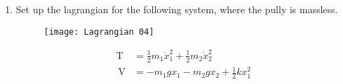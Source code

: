 \begin{enumerate}
\begin{answer}
\begin{align*}
	&=\frac{1}{2}(\dot{\theta})^{2}+\frac{1}{2} m \dot{x}_{3}^{2}=\frac{1}{2} m a^{2} \cdot \dot{\theta}^{2}+\frac{1}{2} m\left(\frac{a}{2} \dot{\theta}+\dot{x}_{2}\right)^{2}\\
	P.E.
	\hspace{2cm}V&=\frac{1}{2} k x_{1}{ }^{2}+\frac{1}{2} k x_{2}{ }^{2}-m g x_{3} .
\intertext{	Hence the Lagrangian for the system is}
\mathrm{L}&=\mathrm{T}-\mathrm{V} \\
\mathrm{L}&=\frac{1}{2} m a^{2} \dot{\theta}^{2}+\frac{1}{2} m\left(\frac{a^{2}}{4} \dot{\theta}^{2}+a \dot{\theta} \dot{x}_{2}+\dot{x}_{2}^{2}\right)-\frac{1}{2} k x_{1}^{2}-\frac{1}{2} k x_{2}^{2}+m g\left(\frac{a}{2} \theta+x_{2}\right)\\
\text{Lagrangian eq. of motion, }&\frac{d}{d t}\left(\frac{\partial L}{\partial \dot{x}_{2}}\right)-\left(\frac{\partial L}{\partial x_{2}}\right)=0 \Rightarrow \frac{d}{d t}\left(\frac{\partial L}{\partial \dot{\theta}}\right)-\left(\frac{\partial L}{\partial \theta}\right)\\
\text { Or } \quad \frac{d}{d t}\left[\frac{1}{2} m a \theta+m \dot{x}_{2}\right]&-\left[-k x_{2}+m g\right]=0  \Rightarrow m \ddot{x}_{2}+k x_{2}+\frac{1}{2} m(a \ddot{\theta}-2 g)=0 \\ 
\text { Or } \quad \ddot{x}+\left(\frac{k}{m}\right) x_{2}&+\frac{1}{2}(a \ddot{\theta}-2 g)=0 \quad  \Rightarrow \frac{d}{d t}\left[\frac{1}{2} m a^{2} \dot{\theta}+\frac{1}{2} m a^{2}+\dot{\theta} \max _{2}\right]-\left[-k a^{2} \theta+\frac{m g a}{2}\right]\\
\text{Or }\quad \frac{3}{4} m a^{2} \ddot{\theta}&+R a^{2} \theta+\frac{1}{2} m a\left(\ddot{x}_{2}-g\right)=0\\
\text{Or }\quad \ddot{\theta}&+\left(\frac{4}{3} \frac{k}{m}\right) \theta+\frac{2}{3 a}\left(\ddot{x}_{2}-g\right)=0
\intertext{Which are the required equation of motion.}
	\end{align*}
\end{answer}
\item Set up the lagrangian for the following system, where the pully is massless.
\begin{figure}[H]
	\centering
	\texttt{[image: Lagrangian 04]}
\end{figure}
\begin{answer}
	\begin{align*}
	\mathrm{T}&=\frac{1}{2} m_{1} \dot{x}_{1}^{2}+\frac{1}{2} m_{2} \dot{x}_{2}^{2}\\
	\mathrm{~V}&=-m_{1} g x_{1}-m_{2} g x_{2}+\frac{1}{2} k x_{1}^{2}\\

\end{align*}
\end{answer}
\end{enumerate}
